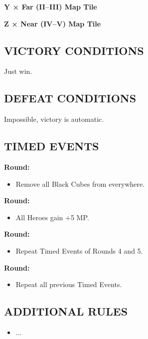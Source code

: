 \begin{multicols*}{2}
\textbf{Y × Far (II--III) Map Tile}

\textbf{Z × Near (IV--V) Map Tile}

\subsection*{\MakeUppercase{Victory Conditions}}
Just win.

\subsection*{\MakeUppercase{Defeat Conditions}}
Impossible, victory is automatic.

\subsection*{\MakeUppercase{Timed Events}}
\textbf{ Round:}
\begin{itemize}
  \item Remove all Black Cubes from everywhere.
\end{itemize}
\textbf{ Round:}
\begin{itemize}
  \item All Heroes gain +5 MP.
\end{itemize}
\textbf{ Round:}
\begin{itemize}
  \item Repeat Timed Events of Rounds 4 and 5.
\end{itemize}
\textbf{ Round:}
\begin{itemize}
  \item Repeat all previous Timed Events.
\end{itemize}


%
%
%

\subsection*{\MakeUppercase{Additional Rules}}

\begin{itemize}
    \item ...
\end{itemize}

\end{multicols*}

